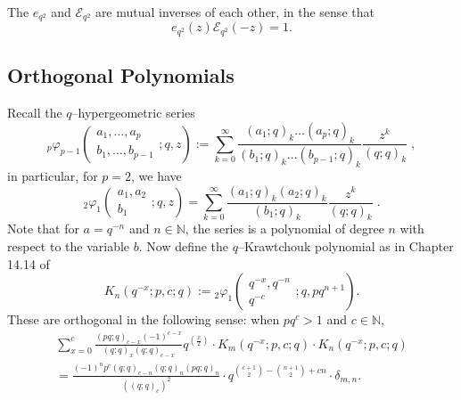 \documentclass{ximera}
\begin{document}
The $e_{q^2}$ and $\mathcal{E}_{q^2}$ are mutual inverses of each other, in the sense that
\begin{equation}\label{Inverses}
e_{q^2}(z)\mathcal{E}_{q^2}(-z)=1.
\end{equation}




\subsection{Orthogonal Polynomials}
Recall the $q$--hypergeometric series
\begin{equation}
{ }_{p} \varphi_{p-1}\left(\begin{array}{c}a_1, \ldots , a_p \\ b_1, \ldots , b_{p-1}\end{array} ; q, z\right):=\sum_{k=0}^{\infty} \frac{(a_1 ; q)_{k} \dots (a_p ; q)_{k}}{(b_1 ; q)_{k}  \dots (b_{p-1} ; q)_{k}}  \frac{z^{k}}{(q ; q)_{k}} \;,
\end{equation}
in particular, for $p=2$, we have
\begin{equation}
{ }_{2} \varphi_{1}\left(\begin{array}{c}a_1, a_2 \\ b_1\end{array} ; q, z\right)=\sum_{k=0}^{\infty} \frac{(a_1 ; q)_{k}(a_2 ; q)_{k}}{(b_1 ; q)_{k}} \frac{z^{k}}{(q ; q)_{k}} \;.
\end{equation}
Note that for
$a = q^{-n}$ and $n \in \mathbb{N}$, the series is a polynomial of degree $n$ with respect to the variable $b$.
Now define the $q$--Krawtchouk polynomial as in Chapter 14.14 of \cite{KLS}
\begin{equation*}
K_{n}\left(q^{-x} ; p, c ; q\right):={ }_{2} \varphi_{1}\left(\begin{array}{c}q^{-x}, q^{-n} \\ q^{-c}\end{array} ; q, p q^{n+1}\right).
\end{equation*}
These are orthogonal in the following sense: when $pq^c>1$ and $c \in \mathbb{N}$, 
\begin{multline*}
\sum_{x=0}^{c} \frac{(p q ; q)_{c-x}(-1)^{c-x}}{(q ; q)_{x}(q ; q)_{c-x}} q^{\left(\frac{x}{2}\right)} \cdot K_{m}\left(q^{-x} ; p, c ; q\right) \cdot K_{n}\left(q^{-x} ; p, c ; q\right)\\
=\frac{(-1)^{n} p^{c}(q ; q)_{c-n}(q ; q)_{n}(p q ; q)_{n}}{\left((q ; q)_{c}\right)^{2}} \cdot 
q^{\binom{c+1}{  2} -\binom{n+1}{  2} +cn}
\cdot
\delta_{m, n}.
\end{multline*}
\end{document}
